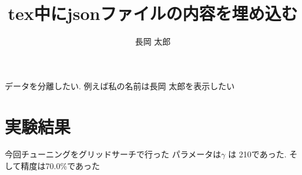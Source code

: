 \documentclass[uplatex]{jsarticle}
\begin{document}
\title{tex中にjsonファイルの内容を埋め込む}
\author{
長岡 太郎
}
\maketitle

データを分離したい.
例えば私の名前は長岡 太郎を表示したい


\section{実験結果}
今回チューニングをグリッドサーチで行った
パラメータは$\gamma$ は 210であった.
そして精度は70.0\%であった
\end{document}
